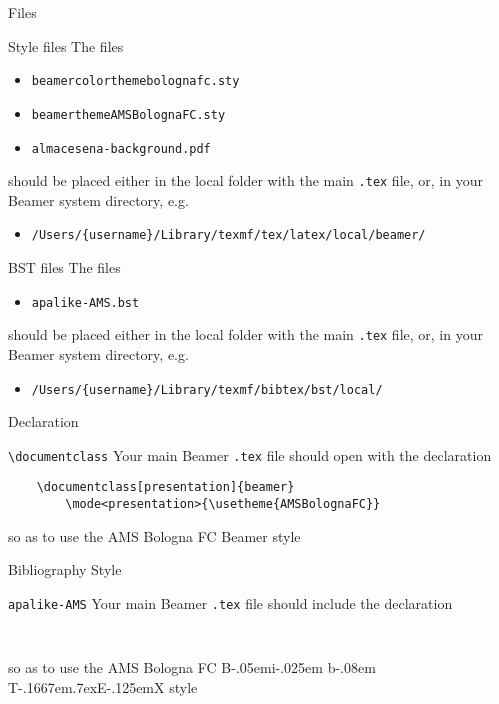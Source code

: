 \documentclass[presentation]{beamer}\mode<presentation>{\usetheme{AMSBolognaFC}}
\def\BibTeX{{\rm B\kern-.05em{\sc i\kern-.025em b}\kern-.08em
    T\kern-.1667em\lower.7ex\hbox{E}\kern-.125emX}}
\begin{document}
\begin{frame}[c,allowframebreaks]{Files}
%
\begin{block}{Style files}
The files
\begin{itemize}
	\item \texttt{beamercolorthemebolognafc.sty}
	\item \texttt{beamerthemeAMSBolognaFC.sty}
	\item \texttt{almacesena-background.pdf}
\end{itemize}
should be placed either in the local folder with the main \texttt{.tex} file, or, in your Beamer system directory, e.g.
\begin{itemize}
	\item \texttt{/Users/\{username\}/Library/texmf/tex/latex/local/beamer/}
\end{itemize}
\end{block}
%
\begin{block}{BST files}
The files
\begin{itemize}
	\item \texttt{apalike-AMS.bst}
\end{itemize}
should be placed either in the local folder with the main \texttt{.tex} file, or, in your Beamer system directory, e.g.
\begin{itemize}
	\item \texttt{/Users/\{username\}/Library/texmf/bibtex/bst/local/}
\end{itemize}
\end{block}
%
\end{frame}

\begin{frame}[c,fragile]{Declaration}
%
\begin{block}{\texttt{\textbackslash{}documentclass}}
Your main Beamer \texttt{.tex} file should open with the declaration
%
\begin{verbatim}
    \documentclass[presentation]{beamer}
        \mode<presentation>{\usetheme{AMSBolognaFC}}
\end{verbatim}
%
so as to use the AMS Bologna FC Beamer style 
\end{block}
%
\end{frame}

\begin{frame}[c,fragile]{Bibliography Style}
%
\begin{block}{\texttt{apalike-AMS}}
Your main Beamer \texttt{.tex} file should include the declaration
\begin{verbatim}
    
\end{verbatim}	
so as to use the AMS Bologna FC \BibTeX{} style 
\end{block}
%
\end{frame}
\end{document}
